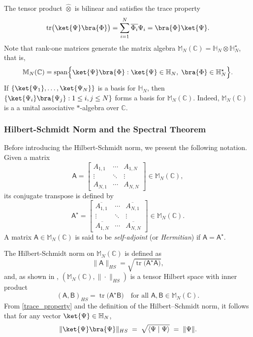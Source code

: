 \documentclass[a4paper,11pt]{article}
\DeclareMathOperator{\tr}{tr}
\newcommand{\rA}{\mathsf{A}}
\newcommand{\rB}{\mathsf{B}}
\begin{document}
\bigskip

The tensor product \(\widehat{\otimes}\) is bilinear and satisfies the trace property
\begin{equation}\label{trace_property}
\tr\bigl(\ket{\Psi}\bra{\Phi}\bigr) = \sum_{i=1}^N \overline{\Phi_i}\Psi_i = \bra{\Phi}\ket{\Psi}.
\end{equation}
Note that rank-one matrices generate the matrix algebra \(\mathbb{M}_N(\mathbb{C})=\mathbb{H}_N \otimes \mathbb{H}_N^{\star}\), that is,
\[
  \mathbb{M}_N(\mathbb{C}) = \mathrm{span}\Bigl\{ \ket{\Psi}\bra{\Phi} : \ket{\Psi} \in \mathbb{H}_N,\; \bra{\Phi} \in \mathbb{H}_N^{\star} \Bigr\}.
\]
If \(\{\ket{\Psi_1},\dots,\ket{\Psi_N}\}\) is a basis for \(\mathbb{H}_N\), then \(\{\ket{\Psi_i}\bra{\Psi_j} : 1\le i,j\le N\}\) forms a basis for \(\mathbb{M}_N(\mathbb{C})\). Indeed, $\mathbb{M}_N(\mathbb{C})$ is a a unital associative $*$-algebra over $\mathbb{C}.$

\subsubsection{Hilbert-Schmidt Norm and the Spectral Theorem}

Before introducing the Hilbert-Schmidt norm, we present the following notation. Given a matrix
\[
\rA = \begin{bmatrix}
A_{1,1} & \cdots & A_{1,N} \\
\vdots & \ddots & \vdots \\
A_{N,1} & \cdots & A_{N,N}
\end{bmatrix} \in \mathbb{M}_N(\mathbb{C}),
\]
its conjugate transpose is defined by
\[
\rA^{\star} = \begin{bmatrix}
\overline{A_{1,1}} & \cdots & \overline{A_{N,1}} \\
\vdots & \ddots & \vdots \\
\overline{A_{1,N}} & \cdots & \overline{A_{N,N}}
\end{bmatrix} \in \mathbb{M}_N(\mathbb{C}).
\]
A matrix \(\rA \in \mathbb{M}_N(\mathbb{C})\) is said to be \emph{self-adjoint} (or \emph{Hermitian}) if \(\rA = \rA^{\star}\). 

\bigskip

The Hilbert-Schmidt norm on \(\mathbb{M}_N(\mathbb{C})\) is defined as
\[
\|\rA\|_{HS} = \sqrt{\tr\bigl(\rA^{\star}\rA\bigr)},
\]
and, as shown in \cite{Hackbusch2012}, \((\mathbb{M}_N(\mathbb{C}), \|\cdot\|_{HS})\) is a tensor Hilbert space with inner product
\[
(\rA, \rB)_{HS} = \tr\bigl(\rA^{\star}\rB\bigr) \quad \text{for all } \rA,\rB \in \mathbb{M}_N(\mathbb{C}).
\]
From \eqref{trace_property} and the definition of the Hilbert--Schmidt norm, it follows that for any vector \(\ket{\Psi}\in \mathbb{H}_N\),
\[
\|\ket{\Psi}\bra{\Psi}\|_{HS} \;=\; \sqrt{\langle \Psi \mid \Psi\rangle} \;=\; \|\Psi\|.
\]
\end{document}
